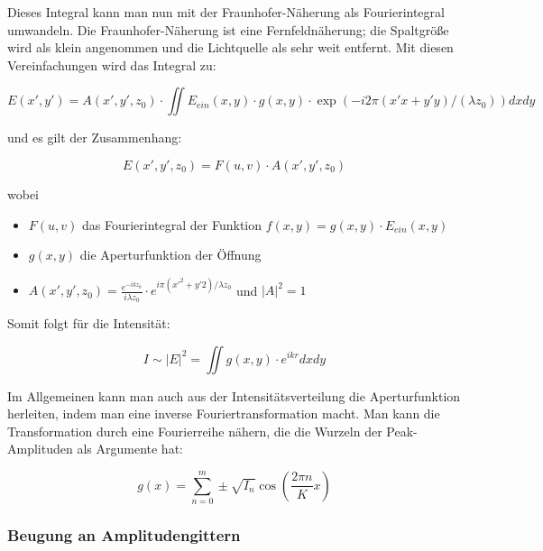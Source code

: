 Dieses Integral kann man nun mit der Fraunhofer-N\"aherung als Fourierintegral umwandeln. Die Fraunhofer-N\"aherung ist eine Fernfeldn\"aherung; die Spaltgr\"o\ss e wird als klein angenommen und die Lichtquelle als sehr weit entfernt. Mit diesen Vereinfachungen wird das Integral zu:

$$ E(x',y') = A(x',y',z_0)\cdot \iint E_{ein}(x,y)\cdot g(x,y)\cdot \exp(-i2\pi(x'x+y'y)/(\lambda z_0)) dxdy $$

und es gilt der Zusammenhang:

$$ E(x',y',z_0) = F(u,v) \cdot A(x',y',z_0)$$

wobei \begin{itemize}
\item $F(u,v)$ das Fourierintegral der Funktion $f(x,y) = g(x,y)\cdot E_{ein}(x,y)$
\item $g(x,y)$ die Aperturfunktion der \"Offnung
\item $A(x',y',z_0)=\frac{e^{-ikz_0}}{i\lambda z_0}\cdot e^{i\pi (x'^2 + y'2) / \lambda z_0}$ und $|A|^2 =1$
\end{itemize}

Somit folgt f\"ur die Intensit\"at:

$$I \sim |E|^2 = \iint g(x,y)\cdot e^{ikr} dxdy$$

Im Allgemeinen kann man auch aus der Intensit\"atsverteilung die Aperturfunktion herleiten, indem man eine inverse Fouriertransformation macht. Man kann die Transformation durch eine Fourierreihe n\"ahern, die die Wurzeln der Peak-Amplituden als Argumente hat:

$$g(x) = \sum_{n=0}^m \pm \sqrt{I_n} \cos\left(\frac{2\pi n}{K}x\right)$$


\subsubsection{Beugung an Amplitudengittern}

